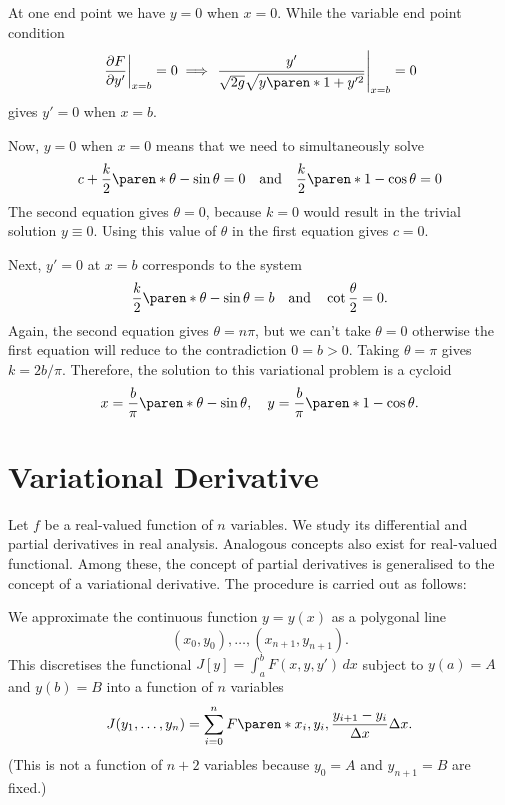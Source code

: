 \documentclass[11pt]{penrose}
\begin{document}
\begin{negg}
    At one end point we have $y = 0$ when $x = 0$. While the variable end point condition
    \begin{equation}
        \left. \frac{\pd F}{\pd y'} \right|_{x=b} = 0
        \implies
        \left. \frac{y'}{ \sqrt{2g} \sqrt{y \paren*{1 + y'^2}}} \right|_{x=b} = 0
    \end{equation}
    gives $y' = 0$ when $x = b$.

    Now, $y = 0$ when $x = 0$ means that we need to simultaneously solve
    \begin{equation}
        c + \frac{k}{2} \paren*{\theta - \sin\theta} = 0
        \quad\text{and}\quad
        \frac{k}{2} \paren*{1 - \cos\theta} = 0
    \end{equation}
    The second equation gives $\theta = 0$, because $k = 0$ would result in the trivial solution $y \equiv 0$. Using this value of $\theta$ in the first equation gives $c = 0$.

    Next, $y' = 0$ at $x = b$ corresponds to the system
    \begin{equation}
        \frac{k}{2} \paren*{\theta - \sin\theta} = b
        \quad\text{and}\quad
        \cot \frac{\theta}{2} = 0.
    \end{equation}
    Again, the second equation gives $\theta = n\pi$, but we can't take $\theta = 0$ otherwise the first equation will reduce to the contradiction $0 = b > 0$. Taking $\theta = \pi$ gives $k = 2b/\pi$. Therefore, the solution to this variational problem is a cycloid
    \begin{equation}
        x = \frac{b}{\pi} \paren*{\theta - \sin\theta},
        \quad
        y = \frac{b}{\pi} \paren*{1 - \cos\theta}.
    \end{equation}
\end{negg}

\section{Variational Derivative}
Let $f$ be a real-valued function of $n$ variables. We study its differential and partial derivatives in real analysis. Analogous concepts also exist for real-valued functional. Among these, the concept of partial derivatives is generalised to the concept of a variational derivative. The procedure is carried out as follows:

We approximate the continuous function $y = y(x)$ as a polygonal line
\begin{equation}
    (x_0, y_0), \dots, (x_{n+1}, y_{n+1}).
\end{equation}
This discretises the functional $J[y] = \int_a^b F(x, y, y') \,dx$ subject to $y(a) = A$ and $y(b) = B$ into a function of $n$ variables
\begin{equation}
    J(y_1, \dots, y_n)
    = \sum_{i=0}^{n} F \paren*{x_i, y_i, \frac{y_{i+1} - y_i}{\Delta x}} \Delta x.
\end{equation}
(This is not a function of $n+2$ variables because $y_0 = A$ and $y_{n+1} = B$ are fixed.)
\end{document}
